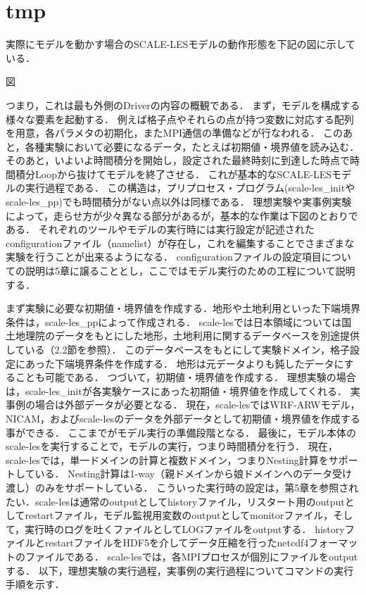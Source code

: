 \section{tmp}
実際にモデルを動かす場合のSCALE-LESモデルの動作形態を下記の図に示している．

{\Huge 図}

つまり，これは最も外側のDriverの内容の概観である．
まず，モデルを構成する様々な要素を起動する．
例えば格子点やそれらの点が持つ変数に対応する配列を用意，各パラメタの初期化，またMPI通信の準備などが行なわれる．
このあと，各種実験において必要になるデータ，たとえば初期値・境界値を読み込む．
そのあと，いよいよ時間積分を開始し，設定された最終時刻に到達した時点で時間積分Loopから抜けてモデルを終了させる．
これが基本的なSCALE-LESモデルの実行過程である．
この構造は，プリプロセス・プログラム(scale-les\_initやscale-les\_pp)でも時間積分がない点以外は同様である．
理想実験や実事例実験によって，走らせ方が少々異なる部分があるが，基本的な作業は下図のとおりである．
それぞれのツールやモデルの実行時には実行設定が記述されたconfigurationファイル（namelist）が存在し，これを編集することでさまざまな実験を行うことが出来るようになる．
configurationファイルの設定項目についての説明は5章に譲ることとし，ここではモデル実行のための工程について説明する．


まず実験に必要な初期値・境界値を作成する．地形や土地利用といった下端境界条件は，scale-les\_ppによって作成される．
scale-lesでは日本領域については国土地理院のデータをもとにした地形，土地利用に関するデータベースを別途提供している（2.2節を参照）．
このデータベースをもとにして実験ドメイン，格子設定にあった下端境界条件を作成する．
地形は元データよりも鈍したデータにすることも可能である．
つづいて，初期値・境界値を作成する．
理想実験の場合は，scale-les\_initが各実験ケースにあった初期値・境界値を作成してくれる．
実事例の場合は外部データが必要となる．
現在，scale-lesではWRF-ARWモデル，NICAM，およびscale-lesのデータを外部データとして初期値・境界値を作成する事ができる．
ここまでがモデル実行の準備段階となる．
最後に，モデル本体のscale-lesを実行することで，モデルの実行，つまり時間積分を行う．
現在，scale-lesでは，単一ドメインの計算と複数ドメイン，つまりNesting計算をサポートしている．
Nesting計算は1-way（親ドメインから娘ドメインへのデータ受け渡し）のみをサポートしている．
こういった実行時の設定は，第5章を参照されたい．scale-lesは通常のoutputとしてhistoryファイル，リスタート用のoutputとしてrestartファイル，モデル監視用変数のoutputとしてmonitorファイル，そして，実行時のログを吐くファイルとしてLOGファイルをoutputする．
historyファイルとrestartファイルをHDF5を介してデータ圧縮を行ったnetcdf4フォーマットのファイルである．
scale-lesでは，各MPIプロセスが個別にファイルをoutputする．
以下，理想実験の実行過程，実事例の実行過程についてコマンドの実行手順を示す．
